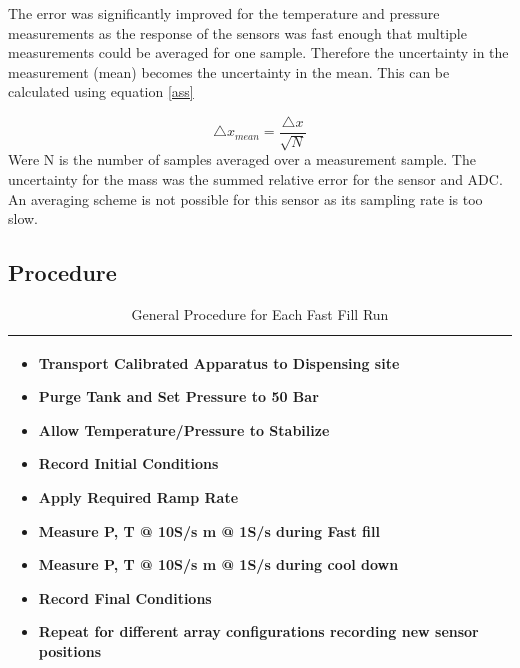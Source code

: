 \documentclass[paper=a4, fontsize=11pt, abstract=on]{scrartcl}
\numberwithin{equation}{section}		%
\numberwithin{figure}{section}			%
\numberwithin{table}{section}				%
\begin{document}
The error was significantly improved for the temperature and pressure measurements as the response of the sensors was fast enough that multiple measurements could be averaged for one sample. Therefore the uncertainty in the measurement (mean) becomes the uncertainty in the mean. This can be calculated using equation \ref{ass}

\begin{equation}
\label{ass}
\triangle{x_{mean}} = \frac{\triangle x}{\sqrt{N}}
\end{equation}
Were N is the number of samples averaged over a measurement sample. The uncertainty for the mass was the summed relative error for the sensor and ADC. An averaging scheme is not possible for this sensor as its sampling rate is too slow.

\subsection{Procedure}



\begin{table}[H]
\begin{center}
    \begin{tabular}{ | p{1.00\linewidth} |}
 \hline  
    \begin{itemize}
\item Transport Calibrated Apparatus to Dispensing site
\item Purge Tank and Set Pressure to 50 Bar
\item Allow Temperature/Pressure to Stabilize 
\item Record Initial Conditions
\item Apply Required Ramp Rate
\item Measure P, T @ 10S/s  m @ 1S/s during Fast fill
\item Measure P, T @ 10S/s  m @ 1S/s during cool down
\item Record Final Conditions
\item Repeat for different array configurations recording new sensor positions
\end{itemize}
    \\ \hline  

    \end{tabular}
\end{center} 
\caption{General Procedure for Each Fast Fill Run}
\label{pro} 
\end{table}
\end{document}
